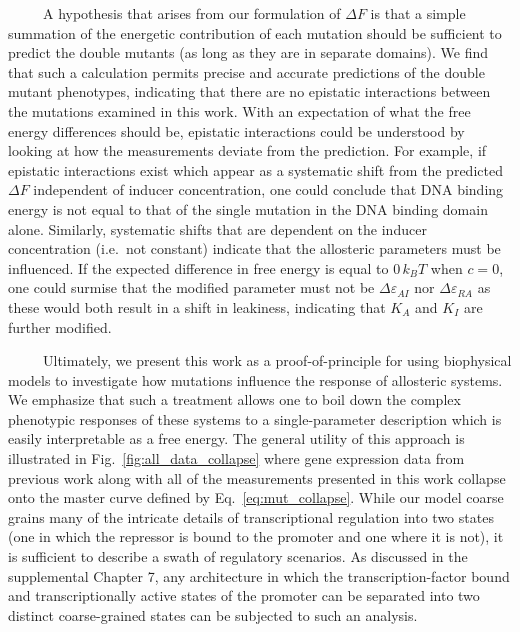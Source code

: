\documentclass[12pt]{caltech_thesis}
\begin{document}
~~~~~A hypothesis that arises from our formulation of \(\Delta F\) is
that a simple summation of the energetic contribution of each mutation
should be sufficient to predict the double mutants (as long as they are
in separate domains). We find that such a calculation permits precise
and accurate predictions of the double mutant phenotypes, indicating
that there are no epistatic interactions between the mutations examined
in this work. With an expectation of what the free energy differences
should be, epistatic interactions could be understood by looking at how
the measurements deviate from the prediction. For example, if epistatic
interactions exist which appear as a systematic shift from the predicted
\(\Delta F\) independent of inducer concentration, one could conclude
that DNA binding energy is not equal to that of the single mutation in
the DNA binding domain alone. Similarly, systematic shifts that are
dependent on the inducer concentration (i.e.~not constant) indicate that
the allosteric parameters must be influenced. If the expected difference
in free energy is equal to \(0\, k_BT\) when \(c=0\), one could surmise
that the modified parameter must not be \(\Delta\varepsilon_{AI}\) nor
\(\Delta\varepsilon_{RA}\) as these would both result in a shift in
leakiness, indicating that \(K_A\) and \(K_I\) are further modified.

~~~~~Ultimately, we present this work as a proof-of-principle for using
biophysical models to investigate how mutations influence the response
of allosteric systems. We emphasize that such a treatment allows one to
boil down the complex phenotypic responses of these systems to a
single-parameter description which is easily interpretable as a free
energy. The general utility of this approach is illustrated in
Fig.~\ref{fig:all_data_collapse} where gene expression data from
previous work along with all of the measurements presented in this work
collapse onto the master curve defined by Eq.~\ref{eq:mut_collapse}.
While our model coarse grains many of the intricate details of
transcriptional regulation into two states (one in which the repressor
is bound to the promoter and one where it is not), it is sufficient to
describe a swath of regulatory scenarios. As discussed in the
supplemental Chapter 7, any architecture in which the
transcription-factor bound and transcriptionally active states of the
promoter can be separated into two distinct coarse-grained states can be
subjected to such an analysis.
\end{document}
